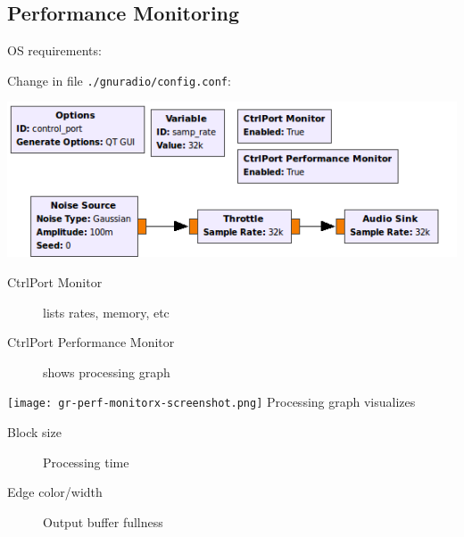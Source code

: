 \documentclass[10pt]{article}
\begin{document}
\begin{multicols*}{3}
\section*{Performance Monitoring}
OS requirements:

Change in file \texttt{./gnuradio/config.conf}:


\includegraphics[width=0.99\linewidth]{control-port.png}
\begin{description}
\item[CtrlPort Monitor] lists rates, memory, etc
\item[CtrlPort Performance Monitor] shows processing graph
\end{description}

\texttt{[image: gr-perf-monitorx-screenshot.png]}
Processing graph visualizes
\begin{description}
\item[Block size] Processing time
\item[Edge color/width] Output buffer fullness
\end{description}


%
%
%
%
%

\end{multicols*}
\end{document}

